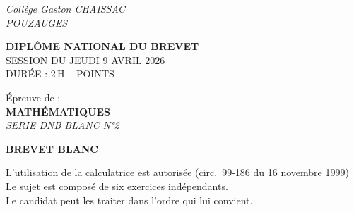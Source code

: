 \documentclass[a4paper,12pt]{article}
\begin{document}
\thispagestyle{fancy}


\begin{flushleft}
{\fontsize{12}{14}\selectfont\textit{Collège Gaston CHAISSAC}}\\[2pt]
{\fontsize{12}{14}\selectfont\textit{POUZAUGES}}
\end{flushleft}

\vspace{1.5cm}

\begin{center}
  {\LARGE\bfseries DIPLÔME NATIONAL DU BREVET}\\[0.6cm]
  {\large SESSION DU JEUDI 9 AVRIL 2026}\\[0.3cm]
  {\large DURÉE : 2\,H \;-- POINTS}
\end{center}

\vspace{1cm}

\begin{center}
\begin{tcolorbox}[
  width=12cm,
  colback=gray!25,
  colframe=gray!25,
  arc=4pt,
  boxrule=0pt,
  halign=center,
  top=10pt, bottom=10pt
]
  {\normalsize Épreuve de :}\\[0.5cm]
  {\Large\bfseries MATHÉMATIQUES}\\[0.4cm]
  {\large\itshape SERIE DNB BLANC N°2}\\[0.5cm]
  \begin{tcolorbox}[
    width=7cm,
    colback=white,
    colframe=black,
    arc=3pt,
    boxrule=0.5pt,
    halign=center,
    top=4pt, bottom=4pt
  ]
    {\normalsize\bfseries BREVET BLANC}
  \end{tcolorbox}
\end{tcolorbox}
\end{center}

\vspace{1cm}

\begin{center}
  L'utilisation de la calculatrice est autorisée (circ.\ 99-186 du 16 novembre 1999)\\[0.3cm]
  Le sujet est composé de six exercices indépendants.\\[0.15cm]
  Le candidat peut les traiter dans l'ordre qui lui convient.
\end{center}
\end{document}
